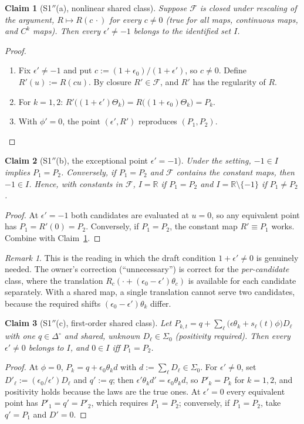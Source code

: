\documentclass[11pt,a4paper]{article}
\theoremstyle{plain}
\newtheorem{claim}{Claim}
\theoremstyle{definition}
\theoremstyle{remark}
\newtheorem*{remark}{Remark}
\newcommand{\eps}{\epsilon}
\newcommand{\R}{\mathbb{R}}
\newcommand{\simp}{\Delta^{\circ}}
\begin{document}
\begin{claim}[S1$''$(a), nonlinear shared class]\label{c:a}
Suppose $\mathcal F$ is closed under rescaling of the argument, $R\mapsto R(c\,\cdot)$ for
every $c\neq0$ (true for all maps, continuous maps, and $C^k$ maps). Then every
$\eps'\neq-1$ belongs to the identified set $I$.
\end{claim}
\begin{proof}
\begin{enumerate}[label=\textbf{Step \arabic*.},leftmargin=*,itemsep=2pt]
\item Fix $\eps'\neq-1$ and put $c:=(1+\eps_0)/(1+\eps')$, so $c\neq0$. Define
$R'(u):=R(cu)$. By closure $R'\in\mathcal F$, and $R'$ has the regularity of $R$.
\item For $k=1,2$:
$R'\big((1+\eps')\Theta_k\big)=R\big((1+\eps_0)\Theta_k\big)=P_k$.
\item With $\phi'=0$, the point $(\eps',R')$ reproduces $(P_1,P_2)$. \qedhere
\end{enumerate}
\end{proof}

\begin{claim}[S1$''$(b), the exceptional point $\eps'=-1$]\label{c:b}
Under the setting, $-1\in I$ implies $P_1=P_2$. Conversely, if $P_1=P_2$ and $\mathcal F$
contains the constant maps, then $-1\in I$. Hence, with constants in $\mathcal F$,
$I=\R$ if $P_1=P_2$ and $I=\R\setminus\{-1\}$ if $P_1\neq P_2$.
\end{claim}
\begin{proof}
At $\eps'=-1$ both candidates are evaluated at $u=0$, so any equivalent point has
$P_1=R'(0)=P_2$. Conversely, if $P_1=P_2$, the constant map $R'\equiv P_1$ works.
Combine with Claim~\ref{c:a}.
\end{proof}

\begin{remark}
This is the reading in which the draft condition $1+\eps'\neq0$ is genuinely needed. The
owner's correction (``unnecessary'') is correct for the \emph{per-candidate} class, where the
translation $R_c(\cdot+(\eps_0-\eps')\theta_c)$ is available for each candidate separately.
With a shared map, a single translation cannot serve two candidates, because the required
shifts $(\eps_0-\eps')\theta_k$ differ.
\end{remark}

\begin{claim}[S1$''$(c), first-order shared class]\label{c:c}
Let $P_{k,t}=q+\sum_\ell\big(\eps\theta_k+s_\ell(t)\phi\big)D_\ell$ with one $q\in\simp$ and
shared, unknown $D_\ell\in\Sigma_0$ (positivity required). Then every $\eps'\neq0$ belongs
to $I$, and $0\in I$ iff $P_1=P_2$.
\end{claim}
\begin{proof}
At $\phi=0$, $P_k=q+\eps_0\theta_k d$ with $d:=\sum_\ell D_\ell\in\Sigma_0$.
For $\eps'\neq0$, set $D'_\ell:=(\eps_0/\eps')D_\ell$ and $q':=q$; then
$\eps'\theta_kd'=\eps_0\theta_kd$, so $P'_k=P_k$ for $k=1,2$, and positivity holds because
the laws are the true ones. At $\eps'=0$ every equivalent point has $P'_1=q'=P'_2$, which
requires $P_1=P_2$; conversely, if $P_1=P_2$, take $q'=P_1$ and $D'=0$.
\end{proof}
\end{document}
